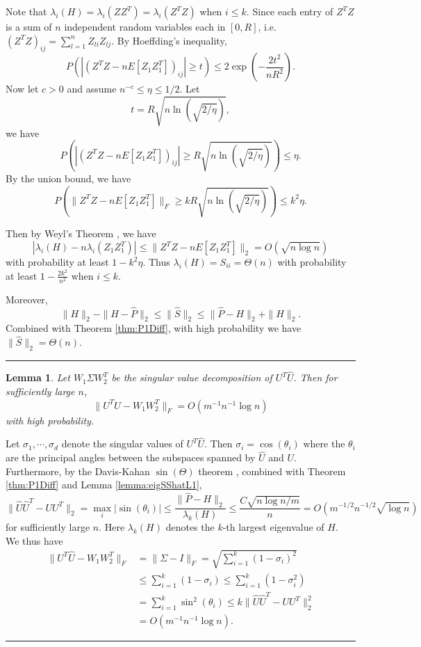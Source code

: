 \documentclass[a4paper]{article}
\newenvironment{proof}{{\bf Proof:  }}{\hfill\rule{2mm}{2mm}}
\newtheorem{lemma}[fact]{Lemma}
\begin{document}
\noindent
\begin{proof}
Note that $\lambda_i(H) = \lambda_i(Z Z^T) = \lambda_i(Z^T Z)$ when $i \le k$. Since each entry of $Z^T Z$ is a sum of $n$ independent random variables each in $[0, R]$, i.e. $(Z^T Z)_{ij} = \sum_{l = 1}^n Z_{li} Z_{lj}$.
By Hoeffding's inequality,
\[
P(|(Z^T Z - n E[Z_1 Z_1^T])_{ij}| \ge t) \le 2 \exp(-\frac{2t^2}{n R^2}).
\]
Now let $c > 0$ and assume $n^{-c} \le \eta \le 1/2$. Let
\[
	t =  R \sqrt{n \ln(\sqrt{2/\eta})},
\]
we have
\[
P(|(Z^T Z - n E[Z_1 Z_1^T])_{ij}| \ge R \sqrt{n \ln(\sqrt{2/\eta})}) \le \eta.
\]
By the union bound, we have
\[
P(\|Z^T Z - n E[Z_1 Z_1^T]\|_F \ge k R \sqrt{n \ln(\sqrt{2/\eta})}) \le k^2 \eta.
\]

Then by Weyl's Theorem \cite{horn2012matrix}, we have
\[
|\lambda_i(H) - n \lambda_i(Z_1 Z_1^T)| \le \|Z^T Z - n E[Z_1 Z_1^T]\|_2 = O(\sqrt{n\log{n}})
\]
with probability at least $1 - k^2 \eta$.
Thus $\lambda_i(H) = S_{ii} = \Theta(n)$ with probability at least $1 - \frac{2 k^2}{n^2}$ when $i \le k$.

Moreover,
\[
\| H \|_2 - \|H - \hat{P}\|_2 \le \|\hat{S}\|_2 \le \|\hat{P} - H\|_2 + \|H\|_2.
\]
Combined with Theorem \ref{thm:P1Diff}, with high probability we have $\|\hat{S}\|_2 = \Theta(n)$.
\end{proof}


\begin{lemma}
\label{lemma:AlmostOrthogonalL1}
Let $W_1 \Sigma W_2^T$ be the singular value decomposition of $U^T \hat{U}$. Then for sufficiently large $n$, 
\[
	\| U^T \hat{U} - W_1 W_2^T \|_F = O(m^{-1} n^{-1} \log n)
\]
with high probability.
\end{lemma}
\begin{proof}
Let $\sigma_1, \cdots, \sigma_d$ denote the singular values of $U^T \hat{U}$. Then $\sigma_i = \cos(\theta_i)$ where the $\theta_i$ are the principal angles between the subspaces spanned by $\hat{U}$ and $U$. Furthermore, by the Davis-Kahan $\sin(\Theta)$ theorem \cite{davis1970rotation}, combined with Theorem \ref{thm:P1Diff} and Lemma \ref{lemma:eigSShatL1},
\begin{equation}
\label{eqn:uhat2u2diffL1}
	\|\hat{U} \hat{U}^T - U U^T\|_2 = \max_i |\sin(\theta_i)|
    \le \frac{\|\hat{P} - H\|_2}{\lambda_k(H)}
    \le \frac{C \sqrt{n \log n/m}}{n} = O(m^{-1/2} n^{-1/2} \sqrt{\log n})
\end{equation}
for sufficiently large $n$. Here $\lambda_k(H)$ denotes the $k$-th largest eigenvalue of $H$.\\
We thus have
\begin{align*}
	\| U^T \hat{U} - W_1 W_2^T \|_F
    & = \| \Sigma - I \|_F
    = \sqrt{\sum_{i=1}^k (1-\sigma_i)^2} \\
    & \le \sum_{i=1}^k (1-\sigma_i) \le \sum_{i=1}^k (1-\sigma_i^2) \\
    & = \sum_{i=1}^k \sin^2(\theta_i)
    \le k \|\hat{U} \hat{U}^T - U U^T\|_2^2 \\
    & = O(m^{-1} n^{-1} \log n).
\end{align*}
\end{proof}
\end{document}
